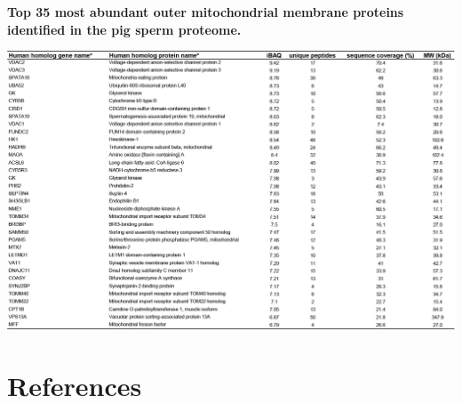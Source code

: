 \begin{subappendices}
\begin{table}[hbt!]
		\label{tab:ch4_app_tab1}
	\end{table}
	\begin{table}[hbt!]
		\caption{\textbf{Top 35 most abundant outer mitochondrial membrane proteins identified in the pig sperm proteome.}}
		\includegraphics[]{Chapter.4/Figures/SI_Table2.png}
		\label{tab:ch4_app_tab2}
	\end{table}
\end{subappendices}
\clearpage
\section*{References}


